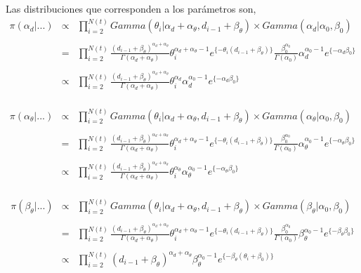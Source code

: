 Las distribuciones que corresponden a los par\'ametros son,
\begin{eqnarray*}
\pi(\alpha_d|...)&\propto& \prod_{i=2}^{N(t)} Gamma(\theta_i|\alpha_d+\alpha_\theta,d_{i-1}+\beta_\theta)\times Gamma(\alpha_d|\alpha_0,\beta_0)\\
\\
&=&\prod_{i=2}^{N(t)}\frac{(d_{i-1}+\beta_\theta)^{\alpha_d+\alpha_\theta}}{\Gamma(\alpha_d+\alpha_\theta)} \theta_i^{\alpha_d+\alpha_\theta-1} e^{\{-\theta_i(d_{i-1}+\beta_\theta)\}}\frac{\beta_0^{\alpha_0}}{\Gamma(\alpha_0)} \alpha_d^{\alpha_0-1}e^{\{-\alpha_d\beta_0\}}\\
\\
&\propto&\prod_{i=2}^{N(t)}\frac{(d_{i-1}+\beta_\theta)^{\alpha_d+\alpha_\theta}}{\Gamma(\alpha_d+\alpha_\theta)} \theta_i^{\alpha_d}\alpha_d^{\alpha_0-1}e^{\{-\alpha_d\beta_0\}}
\end{eqnarray*}
\\
\begin{eqnarray*}
\pi(\alpha_\theta|...)&\propto&\prod_{i=2}^{N(t)} Gamma(\theta_i|\alpha_d+\alpha_\theta,d_{i-1}+\beta_\theta)\times Gamma(\alpha_\theta|\alpha_0,\beta_0)\\
\\
&=&\prod_{i=2}^{N(t)}\frac{(d_{i-1}+\beta_\theta)^{\alpha_d+\alpha_\theta}}{\Gamma(\alpha_d+\alpha_\theta)} \theta_i^{\alpha_d+\alpha_\theta-1} e^{\{-\theta_i(d_{i-1}+\beta_\theta)\}}\frac{\beta_0^{\alpha_0}}{\Gamma(\alpha_0)} \alpha_\theta^{\alpha_0-1}e^{\{-\alpha_\theta\beta_0\}}\\
\\
&\propto& \prod_{i=2}^{N(t)}\frac{(d_{i-1}+\beta_\theta)^{\alpha_d+\alpha_\theta}}{\Gamma(\alpha_d+\alpha_\theta)} \theta_i^{\alpha_\theta}\alpha_\theta^{\alpha_0-1}e^{\{-\alpha_\theta\beta_0\}}
\end{eqnarray*}
\\
\begin{eqnarray*}
\pi(\beta_\theta|...)&\propto&\prod_{i=2}^{N(t)} Gamma(\theta_i|\alpha_d+\alpha_\theta,d_{i-1}+\beta_\theta)\times Gamma(\beta_\theta|\alpha_0,\beta_0)\\
\\
&=&\prod_{i=2}^{N(t)}\frac{(d_{i-1}+\beta_\theta)^{\alpha_d+\alpha_\theta}}{\Gamma(\alpha_d+\alpha_\theta)} \theta_i^{\alpha_d+\alpha_\theta-1} e^{\{-\theta_i(d_{i-1}+\beta_\theta)\}}\frac{\beta_0^{\alpha_0}}{\Gamma(\alpha_0)} \beta_\theta^{\alpha_0-1}e^{\{-\beta_\theta\beta_0\}}\\
\\
&\propto&\prod_{i=2}^{N(t)}(d_{i-1}+\beta_\theta)^{\alpha_d+\alpha_\theta}\beta_\theta^{\alpha_0-1} e^{\{-\beta_\theta(\theta_i+\beta_0)\}}
\end{eqnarray*}
